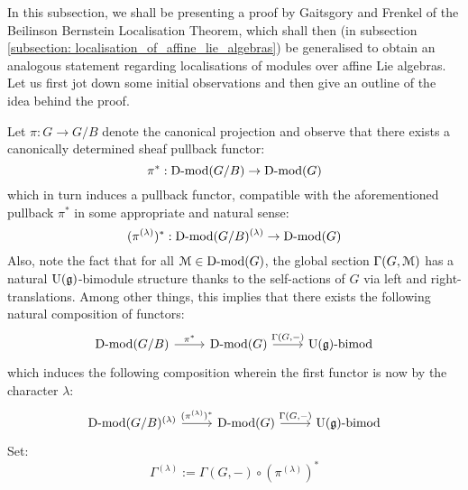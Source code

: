             In this subsection, we shall be presenting a proof by Gaitsgory and Frenkel of the Beilinson Bernstein Localisation Theorem, which shall then (in subsection \ref{subsection: localisation_of_affine_lie_algebras}) be generalised to obtain an analogous statement regarding localisations of modules over affine Lie algebras. Let us first jot down some initial observations and then give an outline of the idea behind the proof.
            
            Let $\pi: G \to G/B$ denote the canonical projection and observe that there exists a canonically determined sheaf pullback functor:
                $$\pi^*: \mathrm{D}\text{-}\mathrm{mod}(G/B) \to \mathrm{D}\text{-}\mathrm{mod}(G)$$
            which in turn induces a  pullback functor, compatible with the aforementioned pullback $\pi^*$ in some appropriate and natural sense:
                $$(\pi^{(\lambda)})^*: \mathrm{D}\text{-}\mathrm{mod}(G/B)^{(\lambda)} \to \mathrm{D}\text{-}\mathrm{mod}(G)$$
            Also, note the fact that for all $\mathcal{M} \in \mathrm{D}\text{-}\mathrm{mod}(G)$, the global section $\Gamma(G, \mathcal{M})$ has a natural $\mathrm{U}(\mathfrak{g})$-bimodule structure thanks to the self-actions of $G$ via left and right-translations. Among other things, this implies that there exists the following natural composition of functors:
                $$
                    \begin{tikzcd}
                    	{\Dmod(G/B}) & {\Dmod(G)} & {\U(\g)\bimod}
                    	\arrow["{\pi^*}", from=1-1, to=1-2]
                    	\arrow["{\Gamma(G, -)}", from=1-2, to=1-3]
                    \end{tikzcd}
                $$
            which induces the following composition wherein the first functor is now  by the character $\lambda$:
                $$
                    \begin{tikzcd}
                    	{\Dmod(G/B)^{(\lambda)}} & {\Dmod(G)} & {\U(\g)\bimod}
                    	\arrow["{(\pi^{(\lambda)})^*}", from=1-1, to=1-2]
                    	\arrow["{\Gamma(G, -)}", from=1-2, to=1-3]
                    \end{tikzcd}
                $$
            Set:
                $$\Gamma^{(\lambda)} := \Gamma(G, -) \circ (\pi^{(\lambda)})^*$$
            
